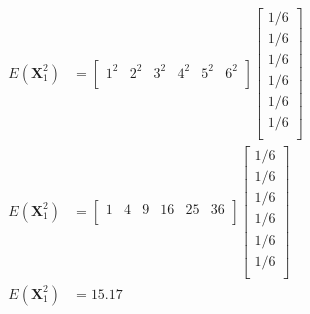\documentclass[12pt,letterpaper, onecolumn]{exam}
\begin{document}
\begin{questions}
\begin{parts}
{\begin{subparts}
\begin{equation}
\begin{split}
						                \end{split}
						            \end{equation}
						            \clearpage
						            \\
						            \solution
						            \begin{equation}
						                \begin{split}
						                    E(\mathbf{X}_1^2) & =
						                    \begin{bmatrix}
						                        1^2 & 2^2 & 3^2 & 4^2 & 5^2 & 6^2 \\
						                    \end{bmatrix}
						                    \begin{bmatrix}
						                        1/6 \\
						                        1/6 \\
						                        1/6 \\
						                        1/6 \\
						                        1/6 \\
						                        1/6 \\
						                    \end{bmatrix}\\
						                    E(\mathbf{X}_1^2) & =
						                    \begin{bmatrix}
						                        1 & 4 & 9 & 16 & 25 & 36 \\
						                    \end{bmatrix}
						                    \begin{bmatrix}
						                        1/6 \\
						                        1/6 \\
						                        1/6 \\
						                        1/6 \\
						                        1/6 \\
						                        1/6 \\
						                    \end{bmatrix}\\
						                    E(\mathbf{X}_1^2) & = 15.17\\
						                \end{split}
						            \end{equation}

\end{subparts}}
\end{parts}
\end{questions}
\end{document}
